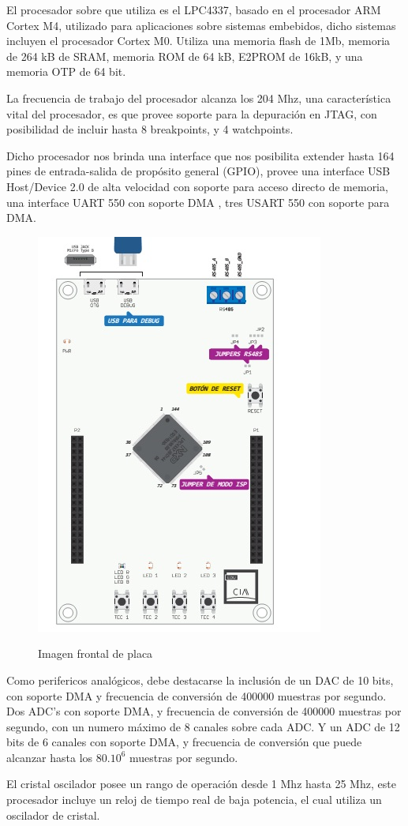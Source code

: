 \documentclass[12pt,letterpaper]{article}
\begin{document}
El procesador sobre que utiliza es el LPC4337, basado en el procesador ARM Cortex M4, utilizado para aplicaciones sobre sistemas embebidos, dicho sistemas incluyen el procesador Cortex M0. Utiliza una memoria flash de 1Mb, memoria de 264 kB de SRAM, memoria ROM de 64 kB, E2PROM de 16kB, y una memoria OTP de 64 bit.

La frecuencia de trabajo del procesador alcanza los 204 Mhz, una característica vital del procesador, es que provee soporte para la depuración en JTAG, con posibilidad de incluir hasta 8 breakpoints, y 4 watchpoints.

Dicho procesador nos brinda una interface que nos posibilita extender hasta 164 pines de entrada-salida de propósito general (GPIO), provee una interface USB Host/Device 2.0 de alta velocidad con soporte para acceso directo de memoria, una interface UART 550 con soporte DMA , tres USART 550 con soporte para DMA\cite{descripcionenhojadatos}.


\begin{figure}[!h]
\centering
\includegraphics[width=6 cm]{figuras/FIGURA_1.jpg}\\
\caption{Imagen frontal de placa}
\label{Fig2}
\end{figure}


Como perifericos analógicos, debe destacarse la inclusión de un DAC de 10 bits, con soporte DMA y frecuencia de conversión de 400000 muestras por segundo. Dos ADC's con soporte DMA, y frecuencia de conversión de 400000 muestras por segundo, con un numero máximo de 8 canales sobre cada ADC. Y un ADC de 12 bits de 6 canales con soporte DMA, y frecuencia de conversión que puede alcanzar hasta los $80 . 10^6$ muestras por segundo.

El cristal oscilador posee un rango de operación desde 1 Mhz hasta 25 Mhz, este procesador incluye un reloj de tiempo real de baja potencia, el cual utiliza un oscilador de cristal.
\end{document}
